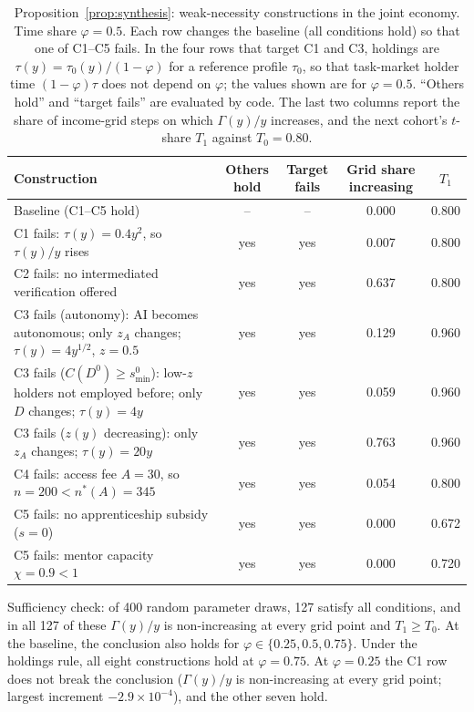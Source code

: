 \begin{table}[t]\centering\small
\caption{Proposition~\ref{prop:synthesis}: weak-necessity constructions in the joint economy. Time share $\varphi=0.5$. Each row changes the baseline (all conditions hold) so that one of C1--C5 fails. In the four rows that target C1 and C3, holdings are $\tau(y)=\tau_0(y)/(1-\varphi)$ for a reference profile $\tau_0$, so that task-market holder time $(1-\varphi)\tau$ does not depend on $\varphi$; the values shown are for $\varphi=0.5$. ``Others hold'' and ``target fails'' are evaluated by code. The last two columns report the share of income-grid steps on which $\Gamma(y)/y$ increases, and the next cohort's $t$-share $T_1$ against $T_0=0.80$.}\label{tab:necessity}
\begin{tabular}{p{}cccc}
\toprule
Construction & Others hold & Target fails & Grid share increasing & $T_1$\\
\midrule
Baseline (C1--C5 hold) & -- & -- & 0.000 & 0.800\\
C1 fails: $\tau(y)=0.4y^2$, so $\tau(y)/y$ rises & yes & yes & 0.007 & 0.800\\
C2 fails: no intermediated verification offered & yes & yes & 0.637 & 0.800\\
C3 fails (autonomy): AI becomes autonomous; only $z_A$ changes; $\tau(y)=4y^{1/2}$, $z=0.5$ & yes & yes & 0.129 & 0.960\\
C3 fails ($C(D^0)\ge s^0_{\min}$): low-$z$ holders not employed before; only $D$ changes; $\tau(y)=4y$ & yes & yes & 0.059 & 0.960\\
C3 fails ($z(y)$ decreasing): only $z_A$ changes; $\tau(y)=20y$ & yes & yes & 0.763 & 0.960\\
C4 fails: access fee $A=30$, so $n=200<n^*(A)=345$ & yes & yes & 0.054 & 0.800\\
C5 fails: no apprenticeship subsidy ($s=0$) & yes & yes & 0.000 & 0.672\\
C5 fails: mentor capacity $\chi=0.9<1$ & yes & yes & 0.000 & 0.720\\
\bottomrule
\end{tabular}
\par\smallskip\raggedright\footnotesize Sufficiency check: of 400 random parameter draws, 127 satisfy all conditions, and in all 127 of these $\Gamma(y)/y$ is non-increasing at every grid point and $T_1\ge T_0$. At the baseline, the conclusion also holds for $\varphi\in\{0.25,0.5,0.75\}$. Under the holdings rule, all eight constructions hold at $\varphi=0.75$. At $\varphi=0.25$ the C1 row does not break the conclusion ($\Gamma(y)/y$ is non-increasing at every grid point; largest increment $-2.9\times10^{-4}$), and the other seven hold.
\end{table}

